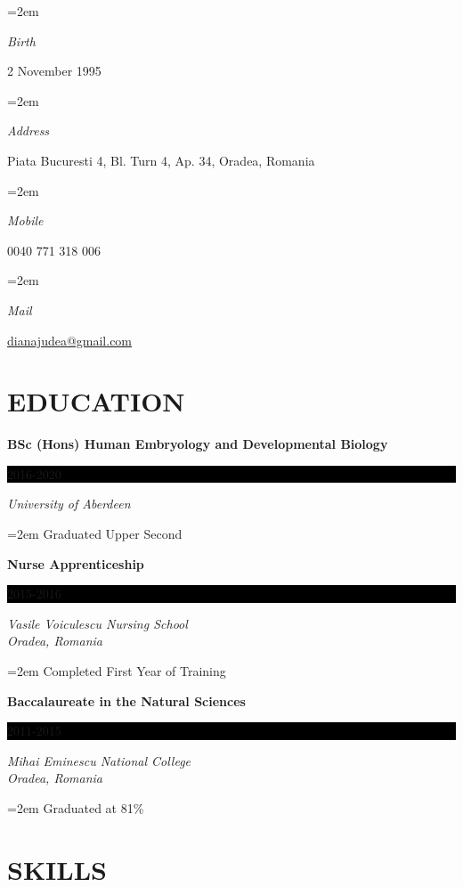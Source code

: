 \documentclass[paper=a4,fontsize=11pt]{scrartcl} %
\newlength{\spacebox}
\newcommand{\sepspace}{\vspace*{1em}}		%
\newcommand{\NewPart}[1]{\section*{\uppercase{{#1}}}}
\newcommand{\PersonalEntry}[2]{
		\noindent\hangindent=2em\hangafter=0 %
		\parbox{\spacebox}{        %
		\textit{#1}}		       %
		\hspace{1.5em} #2 \par}    %
\newcommand{\EducationEntry}[4]{
		\noindent \textbf{#1} \hfill      %
		\colorbox{Black}{%
			\parbox{6em}{%
			\hfill\color{White}#2}} \par  %
		\noindent \textit{#3} \par        %
		\noindent\hangindent=2em\hangafter=0 \small #4 %
		\normalsize \par}
\begin{document}

  \footnotesize

  \PersonalEntry{Birth}{2 November 1995}
  \PersonalEntry{Address}{Piata Bucuresti 4, Bl.  Turn 4, Ap.  34, Oradea, Romania}
  \PersonalEntry{Mobile}{0040 771 318 006}
  \PersonalEntry{Mail}{\href{mailto:dianajudea@gmail.com}{dianajudea@gmail.com}}
  
  \normalsize

  \NewPart{Education}{}

  \EducationEntry{BSc (Hons) Human Embryology and Developmental Biology}{2016-2020}{University of Aberdeen}{Graduated Upper Second}

    \vspace{3pt}

  \EducationEntry{Nurse Apprenticeship}{2015-2016}{Vasile Voiculescu Nursing School \\ Oradea, Romania}{Completed First Year of Training}

    \vspace{3pt}

  \EducationEntry{Baccalaureate in the Natural Sciences}{2011-2015}{Mihai Eminescu National College \\ Oradea, Romania}{Graduated at 81\%}

  \NewPart{Skills}{}
\end{document}
